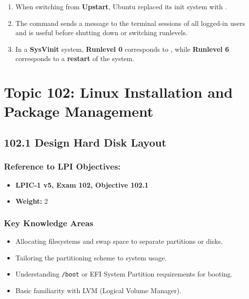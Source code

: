 \documentclass[a4paper]{report}
\begin{document}
\begin{enumerate}[1.]
\item When switching from \textbf{Upstart}, Ubuntu replaced its init system with \textbf{\underline{\hspace{2cm}}}.

\item The \textbf{\underline{\hspace{2cm}}} command sends a message to the terminal sessions of all logged-in users and is useful before shutting down or switching runlevels.

\item In a \textbf{SysVinit} system, \textbf{Runlevel 0} corresponds to \textbf{\underline{\hspace{2cm}}}, while \textbf{Runlevel 6} corresponds to a \textbf{restart} of the system.

\end{enumerate}

\chapter{Topic 102: Linux Installation and Package Management}

\newpage

\section*{102.1 Design Hard Disk Layout}


\subsection*{Reference to LPI Objectives:}
\begin{itemize}
    \item \textbf{LPIC-1 v5, Exam 102, Objective 102.1}
    \item \textbf{Weight:} 2
\end{itemize}

\subsection*{Key Knowledge Areas}
\begin{itemize}
    \item Allocating filesystems and swap space to separate partitions or disks.
    \item Tailoring the partitioning scheme to system usage.
    \item Understanding \texttt{/boot} or EFI System Partition requirements for booting.
    \item Basic familiarity with LVM (Logical Volume Manager).
\end{itemize}
\end{document}

